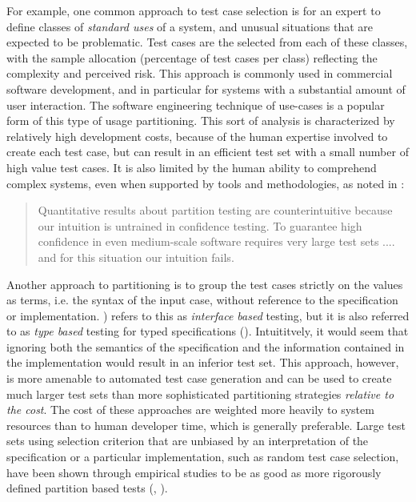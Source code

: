 For example, one common approach to test case selection is
for an expert to define classes of \emph{standard uses} of a system,
and unusual situations that are expected to be problematic.
Test cases are the selected from each of these classes,
with the sample allocation (percentage of test cases per class)
reflecting the complexity and perceived risk.
This approach is commonly used in commercial software development,
and in particular for systems with a substantial amount of user interaction.
The software engineering technique of use-cases  is 
a popular form of this type of usage partitioning.
This sort of analysis is characterized by relatively high development costs,
because of the human expertise involved to create each test case,
but can result in an efficient test set with a small number of high value test cases.
It is also limited by the human ability to comprehend complex systems,
even when supported by tools and methodologies,
as noted in \cite{HamletTaylor1990}:
\begin{quote}
Quantitative results about partition testing are counterintuitive because
our intuition is untrained in confidence testing.
To guarantee high confidence in even medium-scale software requires very large test sets ....
and for this situation our intuition fails.
\end{quote}

Another approach to partitioning is to group the test cases
strictly on the values as terms, i.e. the syntax of the input case,
without reference to the specification or implementation.
\cite{ZhuHallMay1997}) refers to this as \emph{interface based} testing,
but it is also referred to as \emph{type based} testing for 
typed specifications (\cite{Hieronsetal2009}).
Intuititvely, it would seem that ignoring 
both the semantics of the specification and 
the information contained in the implementation
would result in an inferior test set.
This approach, however, is more amenable
to automated test case generation
and can be used to create much larger test sets
than more sophisticated partitioning strategies
\emph{relative to the cost}.
The cost of these approaches are weighted more heavily to system resources
than to human developer time, which is generally preferable.
Large test sets using selection criterion that are unbiased by
an interpretation of the specification or a particular implementation,
such as random test case selection,
have been shown through empirical studies to be as good as
more rigorously defined partition based tests 
(\cite{DuranNtafos1981}, \cite{HamletTaylor1990}).

